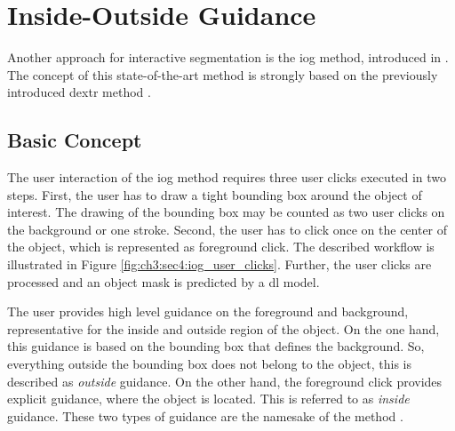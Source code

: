 
\section{Inside-Outside Guidance}\label{ord:ch3:sec4}

Another approach for interactive segmentation is the \gls{iog} method, introduced in \cite{Zha20-IOG}.
The concept of this state-of-the-art method is strongly based on the previously introduced \gls{dextr} method \cite{Man18-DEXTR}.

\subsection{Basic Concept}\label{ord:ch3:sec4:subsec1}
The user interaction of the \gls{iog} method requires three user clicks executed in two steps.
First, the user has to draw a tight bounding box around the object of interest. 
The drawing of the bounding box may be counted as two user clicks on the background or one stroke.
Second, the user has to click once on the center of the object, which is represented as foreground click. 
The described workflow is illustrated in Figure \ref{fig:ch3:sec4:iog_user_clicks}.
Further, the user clicks are processed and an object mask is predicted by a \gls{dl} model.

The user provides high level guidance on the foreground and background, representative for the inside and outside region of the object.
On the one hand, this guidance is based on the bounding box that defines the background.
So, everything outside the bounding box does not belong to the object, this is described as \textit{outside} guidance.
On the other hand, the foreground click provides explicit guidance, where the object is located.
This is referred to as \textit{inside} guidance.
These two types of guidance are the namesake of the method .

